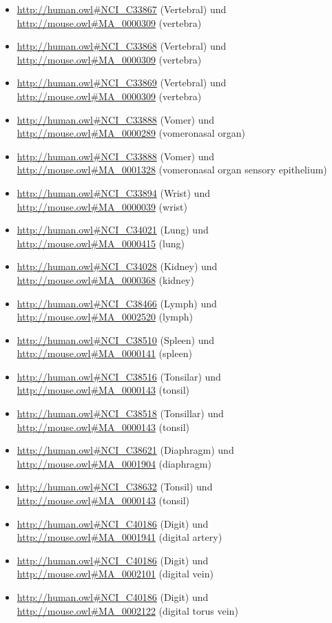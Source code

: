 \begin{itemize}
	\item \url{http://human.owl#NCI_C33867} (Vertebral\textunderscoreArtery\textunderscoreBranch) und \url{http://mouse.owl#MA_0000309} (vertebra)
	\item \url{http://human.owl#NCI_C33868} (Vertebral\textunderscoreBone) und \url{http://mouse.owl#MA_0000309} (vertebra)
	\item \url{http://human.owl#NCI_C33869} (Vertebral\textunderscoreCanal) und \url{http://mouse.owl#MA_0000309} (vertebra)
	\item \url{http://human.owl#NCI_C33888} (Vomer) und \url{http://mouse.owl#MA_0000289} (vomeronasal organ)
	\item \url{http://human.owl#NCI_C33888} (Vomer) und \url{http://mouse.owl#MA_0001328} (vomeronasal organ sensory epithelium)
	\item \url{http://human.owl#NCI_C33894} (Wrist\textunderscoreJoint) und \url{http://mouse.owl#MA_0000039} (wrist)
	\item \url{http://human.owl#NCI_C34021} (Lung\textunderscoreLobe) und \url{http://mouse.owl#MA_0000415} (lung)
	\item \url{http://human.owl#NCI_C34028} (Kidney\textunderscorePart) und \url{http://mouse.owl#MA_0000368} (kidney)
	\item \url{http://human.owl#NCI_C38466} (Lymph\textunderscoreNode\textunderscorePart) und \url{http://mouse.owl#MA_0002520} (lymph)
	\item \url{http://human.owl#NCI_C38510} (Spleen\textunderscorePart) und \url{http://mouse.owl#MA_0000141} (spleen)
	\item \url{http://human.owl#NCI_C38516} (Tonsilar\textunderscoreTissue) und \url{http://mouse.owl#MA_0000143} (tonsil)
	\item \url{http://human.owl#NCI_C38518} (Tonsillar\textunderscoreLymphoid\textunderscoreTissue) und \url{http://mouse.owl#MA_0000143} (tonsil)
	\item \url{http://human.owl#NCI_C38621} (Diaphragm\textunderscorePart) und \url{http://mouse.owl#MA_0001904} (diaphragm)
	\item \url{http://human.owl#NCI_C38632} (Tonsil\textunderscorePart) und \url{http://mouse.owl#MA_0000143} (tonsil)
	\item \url{http://human.owl#NCI_C40186} (Digit) und \url{http://mouse.owl#MA_0001941} (digital artery)
	\item \url{http://human.owl#NCI_C40186} (Digit) und \url{http://mouse.owl#MA_0002101} (digital vein)
	\item \url{http://human.owl#NCI_C40186} (Digit) und \url{http://mouse.owl#MA_0002122} (digital torus vein)

\end{itemize}

